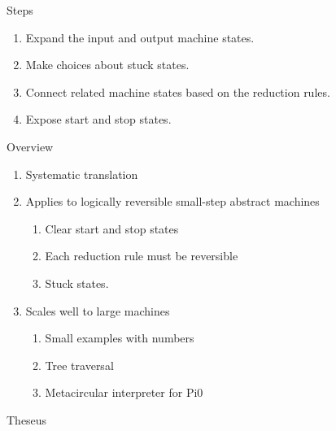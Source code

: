 \documentclass[svgnames,11pt]{beamer}
\begin{document}
\begin{frame}{Steps}

  \begin{enumerate}
\vfill
\item Expand the input and output machine states.
\vfill
\item Make choices about stuck states. 
\vfill
\item Connect related machine states based on the reduction rules.
\vfill
\item Expose start and stop states. 
  \end{enumerate}
\vfill

\end{frame}


\begin{frame}{Overview}

  \begin{enumerate}
\vfill
  \item Systematic translation
\vfill
  \item Applies to logically reversible small-step abstract machines
    \begin{enumerate}
    \item Clear start and stop states
    \item Each reduction rule must be reversible
    \item Stuck states.
    \end{enumerate}
\vfill
  \item Scales well to large machines
    \begin{enumerate}
    \item Small examples with numbers
    \item Tree traversal
    \item Metacircular interpreter for {{Pi0}}
    \end{enumerate}

  \end{enumerate}
\vfill

\end{frame}


\begin{frame}[fragile]{Theseus}

  \begin{block}
    
%
%


%



  \end{block}


\end{frame}
\end{document}
